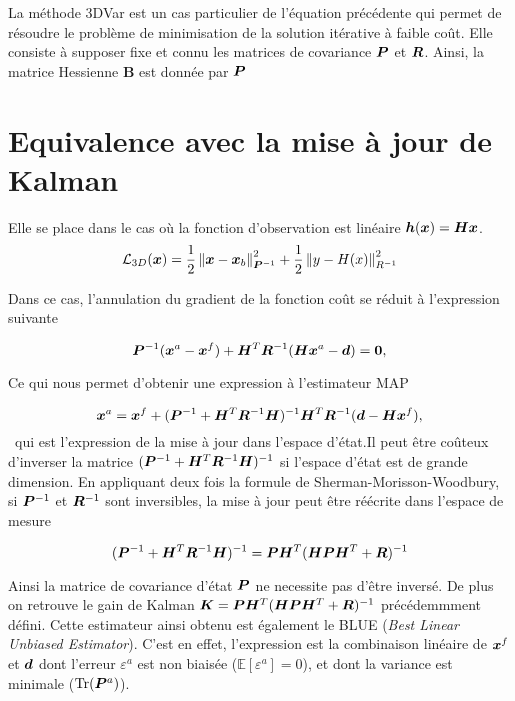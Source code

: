 La méthode 3DVar est un cas particulier de l'équation précédente qui permet de résoudre le problème de minimisation de la solution itérative à faible coût. Elle consiste à supposer fixe et connu les matrices de covariance $\bm{P}$ et $\bm{R}$. Ainsi, la matrice Hessienne $\bm B$ est donnée par $\bm{P}$

\section{Equivalence avec la mise à jour de Kalman}

Elle se place dans le cas où la fonction d'observation est linéaire $\bm h(\bm{x}) = \bm{H} \bm{x}$.
$$\mathcal L_{3D}(\bm{x}) = \frac{1}{2}\left\lVert \bm{x}-\bm{x}_b \right\rVert_{\bm{P}^{-1}}^2+ \frac{1}{2}\left\lVert y-H(x) \right\rVert^2_{R^{-1}}$$

Dans ce cas, l'annulation du gradient de la fonction coût se réduit à l'expression suivante

\begin{equation*}
    \bm{P}^{-1} (\bm{x}^a - \bm{x}^f) + \bm{H}^T \bm{R}^{-1}(\bm{H} \bm{x}^a - \bm d) = \bm 0,
\end{equation*}

Ce qui nous permet d'obtenir une expression à l'estimateur MAP

\begin{equation*}
    \bm{x}^a = \bm{x}^f + (\bm{P}^{-1} + \bm{H}^T \bm{R}^{-1} \bm{H})^{-1} \bm{H}^T \bm{R}^{-1} (\bm{d} - \bm{H} \bm{x}^f),
\end{equation*}~qui est l'expression de la mise à jour dans l'espace d'état.Il peut être coûteux d'inverser la matrice $(\bm{P}^{-1} + \bm{H}^T \bm{R}^{-1} \bm{H})^{-1}$ si l'espace d'état est de grande dimension. En appliquant deux fois la formule de Sherman-Morisson-Woodbury, si $\bm{P}^{-1}$ et $\bm{R}^{-1}$ sont inversibles, la mise à jour peut être réécrite dans l'espace de mesure

\begin{equation*}
    (\bm{P}^{-1} + \bm{H}^T \bm{R}^{-1} \bm{H})^{-1} = \bm{P} \bm{H}^T (\bm{H} \bm{P} \bm{H}^T + \bm{R})^{-1}
\end{equation*}

Ainsi la matrice de covariance d'état $\bm{P}$ ne necessite pas d'être inversé. De plus on retrouve le gain de Kalman $\bm{K} = \bm{P} \bm{H}^T (\bm{H} \bm{P} \bm{H}^T + \bm{R})^{-1}$ précédemmment défini. Cette estimateur ainsi obtenu est également le BLUE (\textit{Best Linear Unbiased Estimator}). C'est en effet, l'expression est la combinaison linéaire de $\bm{x}^f$ et $\bm{d}$ dont l'erreur $\varepsilon^a$ est non biaisée ($\mathbb{E}[\varepsilon^a] = 0$), et dont la variance est minimale ($\operatorname{Tr}(\bm{P}^a)$).

